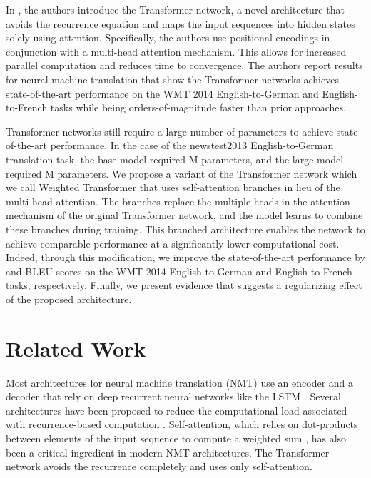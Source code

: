 \documentclass{article} \usepackage{iclr2018_conference,times}
\newcommand{\name}{Weighted Transformer\xspace}
\begin{document}
In \citet{vaswani2017attention}, the authors introduce the Transformer network, a novel architecture that avoids the recurrence equation and maps the input sequences into hidden states solely using attention. Specifically, the authors use positional encodings in conjunction with a multi-head attention mechanism. This allows for increased parallel computation and reduces time to convergence. The authors report results for neural machine translation that show the Transformer networks achieves state-of-the-art performance on the WMT 2014 English-to-German and English-to-French tasks while being orders-of-magnitude faster than prior approaches. 

Transformer networks still require a large number of parameters to achieve state-of-the-art performance. In the case of the newstest2013 English-to-German translation task, the base model required M parameters, and the large model required M parameters. We propose a variant of the Transformer network which we call \name that uses self-attention branches in lieu of the multi-head attention. The branches replace the multiple heads in the attention mechanism of the original Transformer network, and the model learns to combine these branches during training. This branched architecture enables the network to achieve comparable performance at a significantly lower computational cost. Indeed, through this modification, we improve the state-of-the-art performance by  and  BLEU scores on the WMT 2014 English-to-German and English-to-French tasks, respectively. Finally, we present evidence that suggests a regularizing effect of the proposed architecture. 

\section{Related Work}
Most architectures for neural machine translation (NMT) use an encoder and a decoder that rely on deep recurrent neural networks like the LSTM \citep{luong2015effective,sutskever2014sequence,bahdanau2014neural,wu2016google,barone2017deep,cho2014learning}. Several architectures have been proposed to reduce the computational load associated with recurrence-based computation \citep{gehring2016convenc,gehring2017convs2s,kaiser2016can,kalchbrenner2016neural}. Self-attention, which relies on dot-products between elements of the input sequence to compute a weighted sum \citep{lin2017structured,bahdanau2014neural,parikh2016decomposable,kim2017structured}, has also been a critical ingredient in modern NMT architectures. The Transformer network \citep{vaswani2017attention} avoids the recurrence completely and uses only self-attention. 
\end{document}
